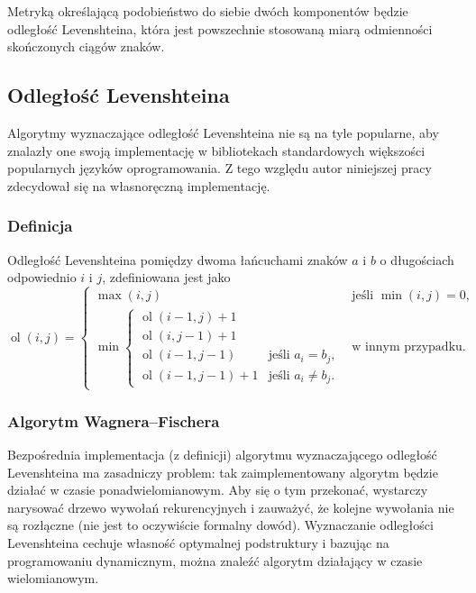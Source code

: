Metryką określającą podobieństwo do siebie dwóch komponentów będzie odległość
Levenshteina, która jest powszechnie stosowaną miarą odmienności skończonych
ciągów znaków.

\subsection{Odległość Levenshteina}
Algorytmy wyznaczające odległość Levenshteina nie są na tyle popularne, aby
znalazły one swoją implementację w bibliotekach standardowych większości
popularnych języków oprogramowania. Z tego względu autor niniejszej pracy
zdecydował się na własnoręczną implementację.

\subsubsection{Definicja}
Odległość Levenshteina pomiędzy dwoma łańcuchami znaków \(a\) i \(b\) o
długościach odpowiednio \(i\) i \(j\), zdefiniowana jest jako
\begin{displaymath}
	\operatorname{ol}(i,j)=
	\begin{cases}
		\max(i,j)                    & \text{jeśli }\min(i,j)=0,  \\
		\min
		\begin{cases}
		\operatorname{ol}(i-1,j)+1 \\
		\operatorname{ol}(i,j-1)+1 \\
		\operatorname{ol}(i-1,j-1)   & \text{jeśli }a_i=b_j,      \\
		\operatorname{ol}(i-1,j-1)+1 & \text{jeśli }a_i \neq b_j. 
	\end{cases} & \text{w innym przypadku}.
	\end{cases}
\end{displaymath}

\subsubsection{Algorytm Wagnera--Fischera}
Bezpośrednia implementacja (z definicji) algorytmu wyznaczającego odległość
Levenshteina ma zasadniczy problem: tak zaimplementowany algorytm będzie działać
w czasie ponadwielomianowym. Aby się o tym przekonać, wystarczy narysować drzewo
wywołań rekurencyjnych i zauważyć, że kolejne wywołania nie są rozłączne (nie
jest to oczywiście formalny dowód). Wyznaczanie odległości Levenshteina cechuje
własność optymalnej podstruktury i bazując na programowaniu dynamicznym, można
znaleźć algorytm działający w czasie wielomianowym.

